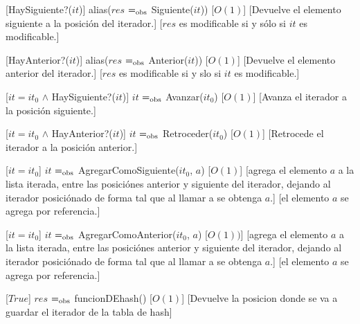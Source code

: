 \begin{Interfaz}
      [HaySiguiente?($it$)]
      {alias($res$ $=_{\mathrm{obs}}$ Siguiente($it$))}
      [$O(1)$]
      [Devuelve el elemento siguiente a la posici\'on del iterador.]
      [$res$ es modificable si y s\'olo si $it$ es modificable.]

      [HayAnterior?($it$)]
      {alias($res$ $=_{\mathrm{obs}}$ Anterior($it$))}
      [$O(1)$]
      [Devuelve el elemento anterior del iterador.]
      [$res$ es modificable si y slo si $it$ es modificable.]

      [$it = it_0$ $\land$ HaySiguiente?($it$)]
      {$it$ $=_{\mathrm{obs}}$ Avanzar($it_0$)}
      [$O(1)$]
      [Avanza el iterador a la posici\'on siguiente.]

      [$it = it_0$ $\land$ HayAnterior?($it$)]
      {$it$ $=_{\mathrm{obs}}$ Retroceder($it_0$)}
      [$O(1)$]
      [Retrocede el iterador a la posici\'on anterior.]

       [$it = it_0$]
       {$it$ $=_{\mathrm{obs}}$ AgregarComoSiguiente($it_0$, $a$)}
       [$O(1)$]
       [agrega el elemento $a$ a la lista iterada, entre las posici\'ones anterior y siguiente del iterador, dejando al iterador posici\'onado de forma tal que al llamar a  se obtenga $a$.]
       [el elemento $a$ se agrega por referencia.]

       [$it = it_0$]
       {$it$ $=_{\mathrm{obs}}$ AgregarComoAnterior($it_0$, $a$)}
       [$O(1))$]
       [agrega el elemento $a$ a la lista iterada, entre las posici\'ones anterior y siguiente del iterador, dejando al iterador posici\'onado de forma tal que al llamar a  se obtenga $a$.]
       [el elemento $a$ se agrega por referencia.]


      [$True$]
      {$res$ $=_{\mathrm{obs}}$ funcionDEhash()}
      [$O(1)$]
      [Devuelve la posicion donde se va a guardar el iterador de la tabla de hash]

\end{Interfaz}

